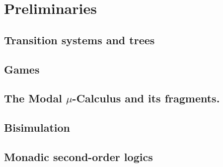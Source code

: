 \documentclass[prodmode,acmtecs]{acmsmall} %
\begin{document}
\clearpage


\section{Preliminaries}\label{sec:prel}

\subsection{Transition systems and trees} \label{ssec:prelim_trees}

\subsection{Games}



\subsection{The Modal $\mu$-Calculus and its fragments.}\label{subsec:mu}



\subsection{Bisimulation}


%
%






\subsection{Monadic second-order logics}\label{sec:prel-so}


\clearpage
\end{document}
